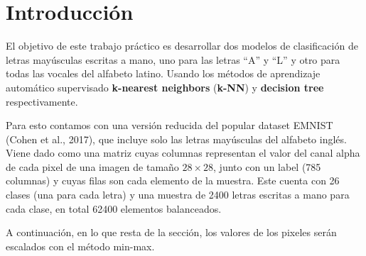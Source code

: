 \documentclass[11pt,a4paper, twocolumn]{article}
\begin{document}

\fecha{\today}


\onecolumn

\maketitle


\section{Introducción}

El objetivo de este trabajo práctico es desarrollar dos modelos de clasificación de letras mayúsculas escritas a mano, uno para las letras ``A'' y ``L'' y otro para todas las vocales del alfabeto latino. Usando los métodos de aprendizaje automático supervisado \textbf{k-nearest neighbors} (\textbf{k-NN}) y \textbf{decision tree} respectivamente.

Para esto contamos con una versión reducida del popular dataset EMNIST (Cohen et al., 2017), que incluye solo las letras mayúsculas del alfabeto inglés. Viene dado como una matriz cuyas columnas representan el valor del canal alpha de cada pixel de una imagen de tamaño $28 \times 28$, junto con un label (785 columnas) y cuyas filas son cada elemento de la muestra. Este cuenta con 26 clases (una para cada letra) y una muestra de 2400 letras escritas a mano para cada clase, en total 62400 elementos balanceados.

A continuación, en lo que resta de la sección, los valores de los pixeles serán escalados con el método min-max.
\end{document}
